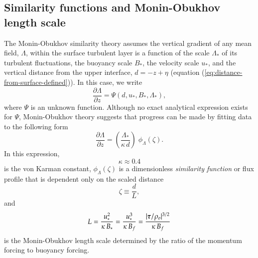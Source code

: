 \subsection{Similarity functions and Monin-Obukhov length scale}
\label{subsection:m-o-similarity-functions}

The Monin-Obukhov similarity theory assumes the vertical gradient of
any mean field, $\Lambda$, within the surface turbulent layer is a
function of the scale $\Lambda_{*}$ of its turbulent fluctuations, the
buoyancy scale $B_{*}$, the velocity scale $u_{*}$, and the vertical
distance from the upper interface, $d=-z+\eta$ (equation
(\ref{eq:distance-from-surface-defined})). In this case, we write
\begin{equation}
 \frac{\partial \Lambda}{\partial z} =  \Psi(d, u_{*}, B_{*}, \Lambda_{*}), 
\end{equation}
where $\Psi$ is an unknown function.  Although no exact analytical
expression exists for $\Psi$, Monin-Obukhov theory suggests that
progress can be made by fitting data to the following
form
\begin{equation}
  \frac{\partial \Lambda}{\partial z} = \left( \frac{\Lambda_{*}}{\kappa \, d} \right) \; \phi_{\Lambda}(\zeta).
\label{eq:m-o-similarity-form}
\end{equation}
In this expression, 
\begin{equation}
 \kappa \approx 0.4 
\label{eq:von-karman-constant}
\end{equation}
is the von Karman constant, $\phi_{\Lambda}(\zeta)$ is a dimensionless
{\it similarity function} or flux profile that is dependent only on
the scaled distance
\begin{equation}
  \zeta \equiv \frac{d}{L},
\label{eq:zeta-scaled-distance-defined}
\end{equation}
 and 
\begin{equation}
  L = \frac{u_{*}^{2}}{\kappa \, B_{*}} = \frac{u_{*}^{3}}{\kappa \, B_{f}} 
  = \frac{ |\mbox{\boldmath $\tau$}/\rho_{o}|^{3/2}}{\kappa \, B_{f}}
\label{eq:m-o-length-scale}
\end{equation}
is the Monin-Obukhov length scale determined by the ratio of the
momentum forcing to buoyancy forcing.

